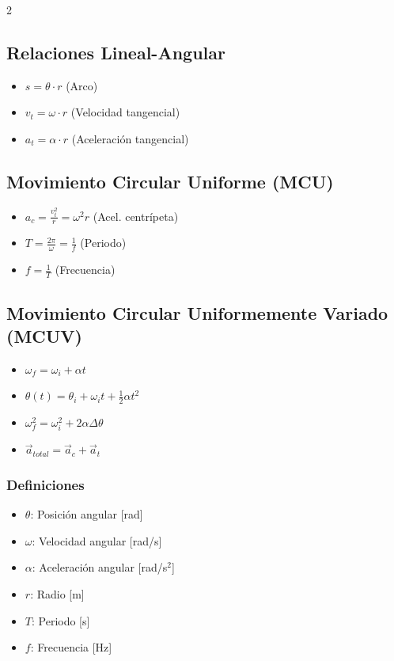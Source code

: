 \documentclass[11pt]{article}
\begin{document}
\begin{multicols}{2}
\begin{tcolorbox}[title=Movimiento Circular]
\subsection*{Relaciones Lineal-Angular}
\begin{itemize}
    \item $s = \theta \cdot r$ (Arco)
    \item $v_t = \omega \cdot r$ (Velocidad tangencial)
    \item $a_t = \alpha \cdot r$ (Aceleración tangencial)
\end{itemize}

\subsection*{Movimiento Circular Uniforme (MCU)}
\begin{itemize}
    \item $a_c = \frac{v_t^2}{r} = \omega^2 r$ (Acel. centrípeta)
    \item $T = \frac{2\pi}{\omega} = \frac{1}{f}$ (Periodo)
    \item $f = \frac{1}{T}$ (Frecuencia)
\end{itemize}

\subsection*{Movimiento Circular Uniformemente Variado (MCUV)}
\begin{itemize}
    \item $\omega_f = \omega_i + \alpha t$
    \item $\theta(t) = \theta_i + \omega_i t + \frac{1}{2}\alpha t^2$
    \item $\omega_f^2 = \omega_i^2 + 2\alpha \Delta\theta$
    \item $\vec{a}_{total} = \vec{a}_c + \vec{a}_t$
\end{itemize}

\subsubsection*{Definiciones}
\begin{itemize}
    \item $\theta$: Posición angular [rad]
    \item $\omega$: Velocidad angular [rad/s]
    \item $\alpha$: Aceleración angular [rad/s$^2$]
    \item $r$: Radio [m]
    \item $T$: Periodo [s]
    \item $f$: Frecuencia [Hz]
\end{itemize}
\end{tcolorbox}


\end{multicols}
\end{document}
